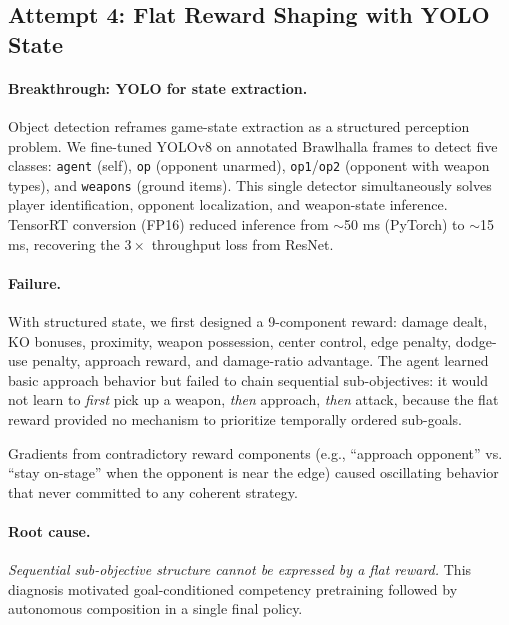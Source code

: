 \documentclass[11pt,a4paper]{article}
\begin{document}
\subsection{Attempt 4: Flat Reward Shaping with YOLO State}
\label{sec:flat-reward-failure}

\paragraph{Breakthrough: YOLO for state extraction.}
Object detection reframes game-state extraction as a structured perception problem.
We fine-tuned YOLOv8 on annotated Brawlhalla frames to detect five classes:
\texttt{agent} (self), \texttt{op} (opponent unarmed), \texttt{op1}/\texttt{op2} (opponent with weapon types), and \texttt{weapons} (ground items).
This single detector simultaneously solves player identification, opponent localization, and weapon-state inference.
TensorRT conversion (FP16) reduced inference from $\sim$50 ms (PyTorch) to $\sim$15 ms, recovering the $3\times$ throughput loss from ResNet.

\paragraph{Failure.}
With structured state, we first designed a 9-component reward: damage dealt, KO bonuses, proximity, weapon possession, center control, edge penalty, dodge-use penalty, approach reward, and damage-ratio advantage.
The agent learned basic approach behavior but failed to chain sequential sub-objectives: it would not learn to \emph{first} pick up a weapon, \emph{then} approach, \emph{then} attack, because the flat reward provided no mechanism to prioritize temporally ordered sub-goals.

Gradients from contradictory reward components (e.g., ``approach opponent'' vs. ``stay on-stage'' when the opponent is near the edge) caused oscillating behavior that never committed to any coherent strategy.

\paragraph{Root cause.}
\emph{Sequential sub-objective structure cannot be expressed by a flat reward.}
This diagnosis motivated goal-conditioned competency pretraining followed by autonomous composition in a single final policy.
\end{document}
